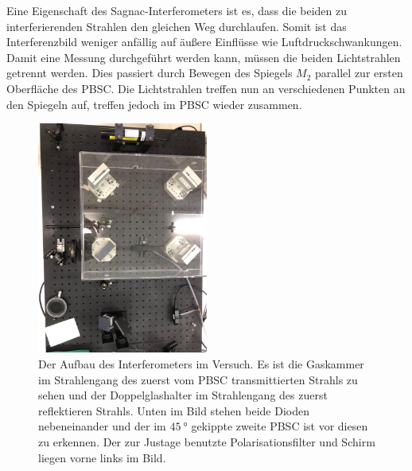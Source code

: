 
\noindent Eine Eigenschaft des Sagnac-Interferometers ist es, dass die beiden zu interferierenden Strahlen den gleichen Weg durchlaufen. Somit ist das Interferenzbild weniger 
anfällig auf äußere Einflüsse wie Luftdruckschwankungen. Damit eine Messung durchgeführt werden kann, müssen die beiden Lichtstrahlen getrennt werden. Dies passiert durch Bewegen 
des Spiegels $M_2$ parallel zur ersten Oberfläche des PBSC. Die Lichtstrahlen treffen nun an verschiedenen Punkten an den Spiegeln auf, treffen jedoch im PBSC wieder zusammen. 

\begin{figure}[H]
    \centering
    \includegraphics[width=0.5\textwidth]{bilder/interfer_foto.png}
    \caption{Der Aufbau des Interferometers im Versuch. Es ist die Gaskammer im Strahlengang des zuerst vom PBSC transmittierten Strahls zu sehen und der Doppelglashalter im Strahlengang 
    des zuerst reflektieren Strahls. Unten im Bild stehen beide Dioden nebeneinander und der im $\SI{45}{\degree}$ gekippte zweite PBSC ist vor diesen zu erkennen. Der zur Justage benutzte 
    Polarisationsfilter und Schirm liegen vorne links im Bild.}
    \label{fig:Interferob}   
\end{figure}


